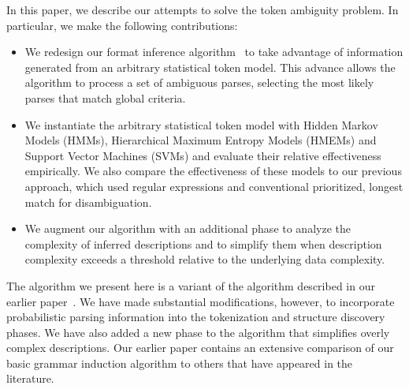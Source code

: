 In this paper, we describe our attempts to solve the token ambiguity problem.
In particular, we make the following contributions:
\begin{itemize}
\item We redesign our format inference algorithm~\cite{fisher+:dirttoshovels} 
to take advantage of information 
generated from an arbitrary statistical token model.
This advance allows the algorithm to process a set of
ambiguous parses, selecting the most likely parses that 
match global criteria.
\item We instantiate the arbitrary statistical token model with
Hidden Markov Models (HMMs), Hierarchical Maximum Entropy Models
(HMEMs) and Support Vector Machines (SVMs) and evaluate 
their relative effectiveness empirically.  We also compare the effectiveness of
these models to our previous approach, which used regular expressions
and conventional prioritized, longest match for disambiguation.
\item We augment our algorithm with an additional phase to
analyze the complexity of inferred descriptions and to simplify
them when description complexity exceeds a threshold relative to
the underlying data complexity.
\end{itemize}

The algorithm we present here is a variant of the algorithm described
in our earlier paper~\cite{fisher+:dirttoshovels}.  We have made
substantial modifications, however, to incorporate probabilistic
parsing information into the tokenization and structure discovery
phases.  We have also added a new phase to the algorithm that
simplifies overly complex descriptions.  Our earlier paper contains an
extensive comparison of our basic grammar induction
algorithm to others that have appeared in the literature.


